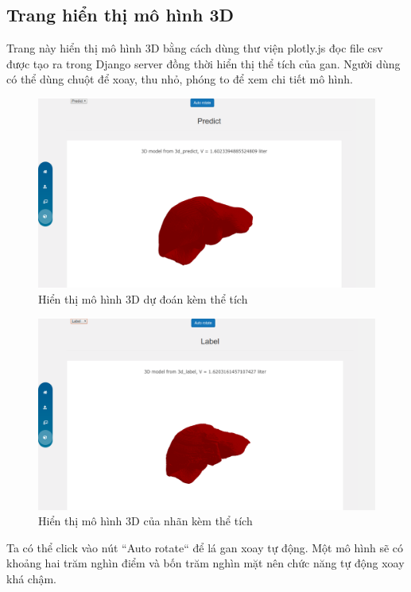 \subsection{Trang hiển thị mô hình 3D}
Trang này hiển thị mô hình 3D bằng cách dùng thư viện plotly.js đọc file csv được tạo ra trong Django server đồng thời hiển thị thể tích của gan. Người dùng có thể dùng chuột để xoay, thu nhỏ, phóng to để xem chi tiết mô hình.
\begin{figure}[h]
\centering
    \includegraphics[totalheight=7cm]{Images/app_3dpredict.png}
    \caption{Hiển thị mô hình 3D dự đoán kèm thể tích}
    \label{skip_conn}
\end{figure}
\begin{figure}[h]
\centering
    \includegraphics[totalheight=7cm]{Images/app_3dlabel.png}
    \caption{Hiển thị mô hình 3D của nhãn kèm thể tích}
    \label{skip_conn}
\end{figure}

Ta có thể click vào nút ``Auto rotate`` để lá gan xoay tự động. Một mô hình sẽ có khoảng hai trăm nghìn điểm và bốn trăm nghìn mặt nên chức năng tự động xoay khá chậm.
